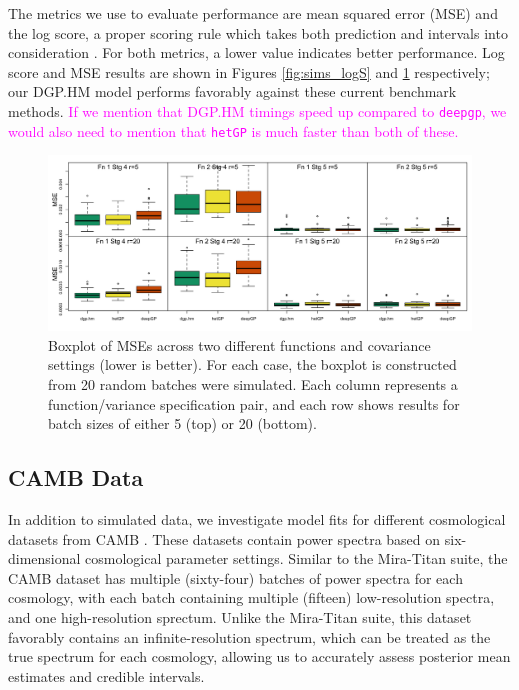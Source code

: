 \documentclass[11pt]{article}
\begin{document}
The metrics we use to evaluate performance are mean squared error (MSE) and the 
log score, a proper scoring rule which takes both prediction and intervals into 
consideration \citep{gneiting2007strictly}. For both metrics, a lower value indicates 
better performance. Log score and MSE results are shown in Figures \ref{fig:sims_logS} 
and \ref{fig:sims_MSE} respectively; our DGP.HM model performs favorably against 
these current benchmark methods. \textcolor{magenta}{If we mention that DGP.HM timings 
speed up compared to \texttt{deepgp}, we would also need to mention that \texttt{hetGP} 
is much faster than both of these.}

\begin{figure}
    \centering
    \includegraphics[width=6in]{sims_MSE.png}
    \caption{Boxplot of MSEs across two different functions and covariance settings 
             (lower is better). For each case, the boxplot is constructed from 20 
             random batches were simulated. Each column represents a function/variance 
             specification pair, and each row shows results for batch sizes of 
             either 5 (top) or 20 (bottom).}    
    \label{fig:sims_MSE}
\end{figure}

\subsection{CAMB Data}
\label{subsec:camb}

In addition to simulated data, we investigate model fits for different cosmological 
datasets from CAMB \citep{lewis2011CAMB}. These datasets contain power spectra based
on six-dimensional cosmological parameter settings. Similar to the Mira-Titan suite, the
CAMB dataset has multiple (sixty-four) batches of power spectra for each cosmology, with each batch 
containing multiple (fifteen) low-resolution spectra, and one high-resolution sprectum. 
Unlike the Mira-Titan suite, this dataset favorably contains an infinite-resolution 
spectrum, which can be treated as the true spectrum for each cosmology,
allowing us to accurately assess posterior mean estimates and credible intervals. 
\end{document}
